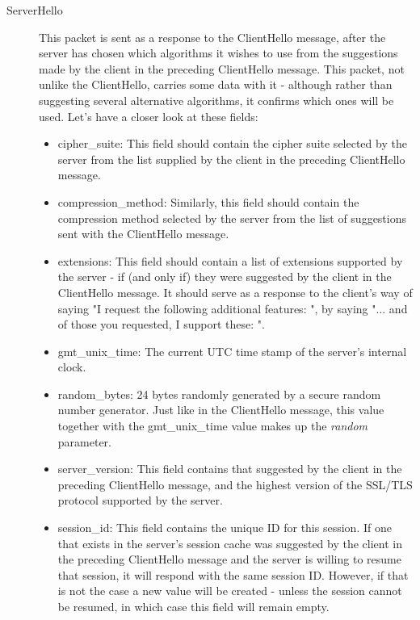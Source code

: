 \begin{description}
	\item[ServerHello] This packet is sent as a response to the ClientHello message, after the server has chosen which algorithms it wishes to use from the suggestions made by the client in the preceding ClientHello message. This packet, not unlike the ClientHello, carries some data with it - although rather than suggesting several alternative algorithms, it confirms which ones will be used. Let's have a closer look at these fields:
	\begin{itemize}
		\item cipher\_suite: This field should contain the cipher suite selected by the server from the list supplied by the client in the preceding ClientHello message.
		\item compression\_method: Similarly, this field should contain the compression method selected by the server from the list of suggestions sent with the ClientHello message.
		
		\item extensions: This field should contain a list of extensions supported by the server - if (and only if) they were suggested by the client in the ClientHello message. It should serve as a response to the client's way of saying "I request the following additional features: ", by saying "... and of those you requested, I support these: ".
		
		\item gmt\_unix\_time: The current UTC time stamp of the server's internal clock.
		\item random\_bytes: 24 bytes randomly generated by a secure random number generator. Just like in the ClientHello message, this value together with the gmt\_unix\_time value makes up the \textit{random} parameter.
		
		\item server\_version: This field contains that suggested by the client in the preceding ClientHello message, and the highest version of the SSL/TLS protocol supported by the server.
		 
		\item session\_id: This field contains the unique ID for this session. If one that exists in the server's session cache was suggested by the client in the preceding ClientHello message and the server is willing to resume that session, it will respond with the same session ID. However, if that is not the case a new value will be created - unless the session cannot be resumed, in which case this field will remain empty. 
	\end{itemize}
	

\end{description}
